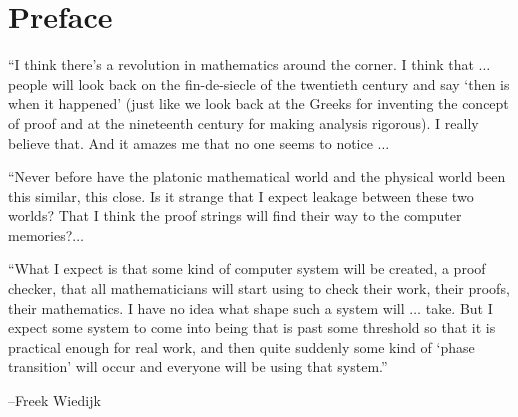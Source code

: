 
\chapter*{Preface}

%
%
%




{

\narrower

{\it

  ``I think there's a revolution in mathematics around the corner. I
  think that $\ldots$ %
  people will look back on the fin-de-siecle of the twentieth century
  and say `then is when it happened' (just like we look back at the
  Greeks for inventing the concept of proof and at the nineteenth
  century for making analysis rigorous). I really believe that. And it
  amazes me that no one seems to notice $\ldots$

  ``Never before have the platonic mathematical world and the physical
  world been this similar, this close. Is it strange that I expect
  leakage between these two worlds? That I think the proof strings
  will find their way to the computer memories?$\ldots$

  ``What I expect is that some kind of computer system will be
  created, a proof checker, that all mathematicians will start using
  to check their work, their proofs, their mathematics. I have no idea
  what shape such a system will $\ldots$ take. But I expect some
  system to come into being that is past some threshold so that it is
  practical enough for real work, and then quite suddenly some kind of
  `phase transition' will occur and everyone will be using that
  system.''

{\hfill--Freek Wiedijk \cite{FWR}} %

}

}

